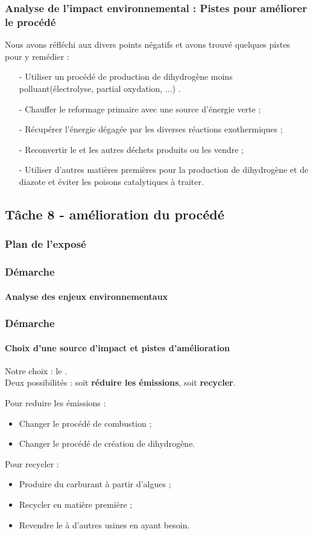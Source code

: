\documentclass{beamer}
\begin{document}
	\begin{frame}
	\frametitle{Analyse de l'impact environnemental : Pistes pour améliorer le procédé}
	Nous avons réfléchi aux divers points négatifs et avons trouvé quelques pistes pour y remédier :
	\begin{itemize}
		\item[-] Utiliser un procédé de production de dihydrogène moins polluant(électrolyse, partial oxydation, ...) .
		\item[-] Chauffer le reformage primaire avec une source d'énergie verte ;
		\item[-] Récupérer l'énergie dégagée par les diverses réactions exothermiques ;
		\item[-] Reconvertir le  et les autres déchets produits ou les vendre ;
		\item[-] Utiliser d'autres matières premières pour la production de dihydrogène et 
		de diazote et éviter les poisons catalytiques à traiter.
	\end{itemize}
	\end{frame}
	
	\begin{frame}
		\section{Tâche 8 - amélioration du procédé}
		\frametitle{Plan de l'exposé}
		\tableofcontents[currentsubsection,sectionstyle=show/shaded,subsectionstyle=show/shaded/hide]
	\end{frame}
	
	\begin{frame}
		\frametitle{Démarche}
		\framesubtitle{Analyse des enjeux environnementaux}
	\end{frame}
	
	\begin{frame}
		\frametitle{Démarche}
		\framesubtitle{Choix d'une source d'impact et pistes d'amélioration} %
		Notre choix : le \chemform{CO_2}.\\
		Deux possibilités : soit \textbf{réduire les émissions}, soit \textbf{recycler}.
		
		Pour reduire les émissions :
		\begin{itemize}
			\item Changer le procédé de combustion ;
			\item Changer le procédé de création de dihydrogène.
		\end{itemize}
		Pour recycler :
		\begin{itemize}
			\item Produire du carburant à partir d'algues ;
			\item Recycler en matière première ;
			\item Revendre le  à d'autres usines
			en ayant besoin.
		\end{itemize}
	\end{frame}
	
\end{document}
